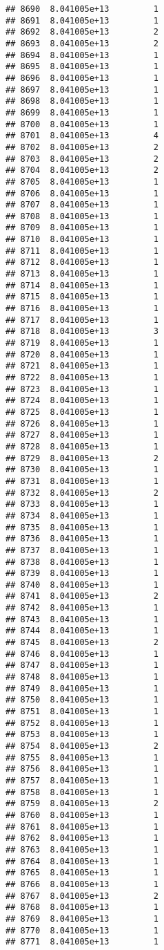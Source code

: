 \documentclass[
]{article}
\begin{document}
\begin{verbatim}
## 8690  8.041005e+13         1
## 8691  8.041005e+13         1
## 8692  8.041005e+13         2
## 8693  8.041005e+13         2
## 8694  8.041005e+13         1
## 8695  8.041005e+13         1
## 8696  8.041005e+13         1
## 8697  8.041005e+13         1
## 8698  8.041005e+13         1
## 8699  8.041005e+13         1
## 8700  8.041005e+13         1
## 8701  8.041005e+13         4
## 8702  8.041005e+13         2
## 8703  8.041005e+13         2
## 8704  8.041005e+13         2
## 8705  8.041005e+13         1
## 8706  8.041005e+13         1
## 8707  8.041005e+13         1
## 8708  8.041005e+13         1
## 8709  8.041005e+13         1
## 8710  8.041005e+13         1
## 8711  8.041005e+13         1
## 8712  8.041005e+13         1
## 8713  8.041005e+13         1
## 8714  8.041005e+13         1
## 8715  8.041005e+13         1
## 8716  8.041005e+13         1
## 8717  8.041005e+13         1
## 8718  8.041005e+13         3
## 8719  8.041005e+13         1
## 8720  8.041005e+13         1
## 8721  8.041005e+13         1
## 8722  8.041005e+13         1
## 8723  8.041005e+13         1
## 8724  8.041005e+13         1
## 8725  8.041005e+13         1
## 8726  8.041005e+13         1
## 8727  8.041005e+13         1
## 8728  8.041005e+13         1
## 8729  8.041005e+13         2
## 8730  8.041005e+13         1
## 8731  8.041005e+13         1
## 8732  8.041005e+13         2
## 8733  8.041005e+13         1
## 8734  8.041005e+13         1
## 8735  8.041005e+13         1
## 8736  8.041005e+13         1
## 8737  8.041005e+13         1
## 8738  8.041005e+13         1
## 8739  8.041005e+13         1
## 8740  8.041005e+13         1
## 8741  8.041005e+13         2
## 8742  8.041005e+13         1
## 8743  8.041005e+13         1
## 8744  8.041005e+13         1
## 8745  8.041005e+13         2
## 8746  8.041005e+13         1
## 8747  8.041005e+13         1
## 8748  8.041005e+13         1
## 8749  8.041005e+13         1
## 8750  8.041005e+13         1
## 8751  8.041005e+13         1
## 8752  8.041005e+13         1
## 8753  8.041005e+13         1
## 8754  8.041005e+13         2
## 8755  8.041005e+13         1
## 8756  8.041005e+13         1
## 8757  8.041005e+13         1
## 8758  8.041005e+13         1
## 8759  8.041005e+13         2
## 8760  8.041005e+13         1
## 8761  8.041005e+13         1
## 8762  8.041005e+13         1
## 8763  8.041005e+13         1
## 8764  8.041005e+13         1
## 8765  8.041005e+13         1
## 8766  8.041005e+13         1
## 8767  8.041005e+13         2
## 8768  8.041005e+13         1
## 8769  8.041005e+13         1
## 8770  8.041005e+13         1
## 8771  8.041005e+13         1

\end{verbatim}
\end{document}
